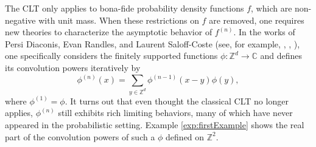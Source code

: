 \documentclass[11pt, letter]{book}
\begin{document}
\noindent The CLT only applies to bona-fide probability density functions $f$, which are non-negative with unit mass. When these restrictions on $f$ are removed, one requires new theories to characterize the asymptotic behavior of $f^{(n)}$. In the works of Persi Diaconis, Evan Randles, and Laurent Saloff-Coste (see, for example, \cite{randles_convolution_2015}, \cite{randles_convolution_2017}, \cite{diaconis_convolution_2014}), one specifically considers the finitely supported functions $\phi: \mathbb{Z}^d \to \mathbb{C}$ and defines its convolution powers iteratively by 
\begin{equation*}
    \phi^{(n)}(x) = \sum_{y\in \mathbb{Z}^d} \phi^{(n-1)} (x-y) \phi(y),
\end{equation*}
where $\phi^{(1)} = \phi$. It turns out that even thought the classical CLT no longer applies, $\phi^{(n)}$ still exhibits rich limiting behaviors, many of which have never appeared in the probabilistic setting. Example \ref{exp:firstExample} shows the real part of the convolution powers of such a $\phi$ defined on $\mathbb{Z}^2$. 
\end{document}
